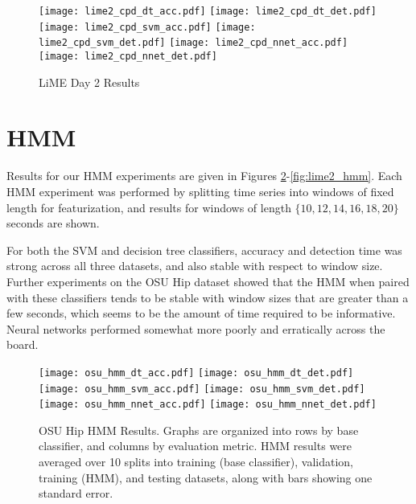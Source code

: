 \begin{figure}[H]
 \centering
 \texttt{[image: lime2\_cpd\_dt\_acc.pdf]} \hspace{1em}\vspace{1em}
 \texttt{[image: lime2\_cpd\_dt\_det.pdf]}
 \texttt{[image: lime2\_cpd\_svm\_acc.pdf]} \hspace{1em}\vspace{1em}
 \texttt{[image: lime2\_cpd\_svm\_det.pdf]}
 \texttt{[image: lime2\_cpd\_nnet\_acc.pdf]} \hspace{1em}
 \texttt{[image: lime2\_cpd\_nnet\_det.pdf]}
 \caption{LiME Day 2 Results}
 \label{fig:lime2_cpd}
\end{figure}


\section{HMM}

Results for our HMM experiments are given in
Figures \ref{fig:osu_hmm}-\ref{fig:lime2_hmm}. Each HMM experiment was
performed by splitting time series into windows of fixed length for
featurization, and results for windows of length $\{10, 12, 14, 16, 18, 20\}$
seconds are shown.

For both the SVM and decision tree classifiers, accuracy and detection time
was strong across all three datasets, and also stable with respect to window
size. Further experiments on the OSU Hip dataset showed that the HMM when
paired with these classifiers
tends to be stable with window sizes that are greater than a few seconds,
which seems to be the amount of time required to be informative. Neural networks
performed somewhat more poorly and erratically across the board.

\begin{figure}[H]
 \centering
 \texttt{[image: osu\_hmm\_dt\_acc.pdf]} \hspace{1em}\vspace{1em}
 \texttt{[image: osu\_hmm\_dt\_det.pdf]}
 \texttt{[image: osu\_hmm\_svm\_acc.pdf]} \hspace{1em}\vspace{1em}
 \texttt{[image: osu\_hmm\_svm\_det.pdf]}
 \texttt{[image: osu\_hmm\_nnet\_acc.pdf]} \hspace{1em}
 \texttt{[image: osu\_hmm\_nnet\_det.pdf]}
 \caption{OSU Hip HMM Results.
  Graphs are organized into rows by base classifier, and columns by evaluation
  metric. HMM results were averaged over 10 splits into training
  (base classifier), validation, training (HMM), and testing datasets, along with bars
  showing one standard error.}
 \label{fig:osu_hmm}
\end{figure}

